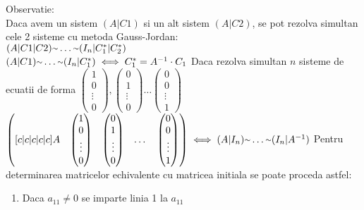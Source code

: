 \documentclass{article}
\newcommand{\mytilde}{\raise.17ex\hbox{$\scriptstyle\mathtt{\sim}$}}
\begin{document}
        Observatie:\\
        Daca avem un sistem $(A|C1)$ si un alt sistem $(A|C2)$, se pot rezolva simultan cele 2 sisteme cu metoda Gauss-Jordan:\\
        $(A|C1|C2)\mytilde \dots \mytilde (I_n|C_1^*|C_2^*)$\\
        $(A|C1) \mytilde \dots \mytilde (I_n|C_1^*) \iff C_1^* = A^{-1} \cdot C_1$
        Daca rezolva simultan $n$ sisteme de ecuatii de forma $\begin{pmatrix} 1\\0\\ \vdots\\ 0 \end{pmatrix}, \begin{pmatrix} 0\\1\\ \vdots\\ 0 \end{pmatrix}
            \dots \begin{pmatrix} 0\\0\\ \vdots\\ 1 \end{pmatrix}$\\
                $\begin{pmatrix}[c|c|c|c|c] A&\begin{pmatrix} 1\\0\\ \vdots\\ 0 \end{pmatrix}& \begin{pmatrix} 0\\1\\ \vdots\\ 0 \end{pmatrix}& \dots &
                    \begin{pmatrix}0\\0\\ \vdots\\ 1\end{pmatrix}\end{pmatrix} \iff (A|I_n) \mytilde \dots \mytilde (I_n|A^{-1})$
        Pentru determinarea matricelor echivalente cu matricea initiala se poate proceda astfel:\\
        \begin{enumerate}
            \item Daca $a_{11}\neq 0$ se imparte linia 1 la $a_{11}$
        \end{enumerate}
\end{document}
